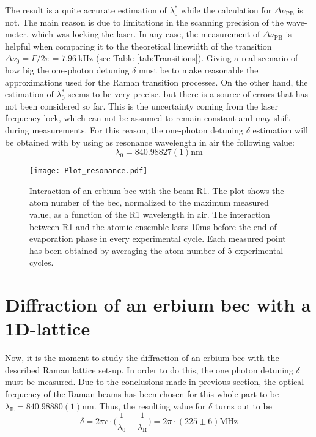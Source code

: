 The result is a quite accurate estimation of $\lambda_0^*$ while the calculation for $\Delta\nu_{\text{PB}}$ is not. The main reason is due to limitations in the scanning precision of the wave-meter, which was locking the laser. In any case, the measurement of $\Delta\nu_{\text{PB}}$ is helpful when comparing it to the theoretical linewidth of the transition $\Delta\nu_0 = \Gamma/2\pi = \SI{7.96}{\kilo\hertz}$ (see Table \ref{tab:Transitions}). Giving a real scenario of how big the one-photon detuning $\delta$ must be to make reasonable the approximations used for the Raman transition processes. On the other hand, the estimation of $\lambda_0^*$ seems to be very precise, but there is a source of errors that has not been considered so far. This is the uncertainty coming from the laser frequency lock, which can not be assumed to remain constant and may shift during measurements. For this reason, the one-photon detuning $\delta$ estimation will be obtained with by using as resonance wavelength in air the following value:
\begin{equation*}
	\lambda_{0} = 840.98827(1)\si{\nano\meter}
\end{equation*}

\begin{figure}\centering
	\texttt{[image: Plot\_resonance.pdf]}
	\caption[Interaction of an erbium \ac{bec} with the beam R1]{Interaction of an erbium \ac{bec} with the beam R1. The plot shows the atom number of the \ac{bec}, normalized to the maximum measured value, as a function of the R1 wavelength in air. The interaction between R1 and the atomic ensemble lasts 10\si{\milli\second} before the end of evaporation phase in every experimental cycle. Each measured point has been obtained by averaging the atom number of 5 experimental cycles. }\label{fig:resonance_841_transition}
\end{figure}

\section{Diffraction of an erbium \ac{bec} with a 1D-lattice}

Now, it is the moment to study the diffraction of an erbium \ac{bec} with the described Raman lattice set-up. In order to do this, the one photon detuning $\delta$ must be measured. Due to the conclusions made in previous section, the optical frequency of the Raman beams has been chosen for this whole part to be $\lambda_\text{R} = 840.98880(1) \si{\nano\meter}$. Thus, the resulting value for $\delta$ turns out to be
\begin{equation*}
	\delta = 2\pi c\cdot\bigg(\frac{1}{\lambda_{0}} - \frac{1}{\lambda_\text{R}} \bigg) = 2\pi \cdot(225 \pm 6) \si{\mega\hertz}
\end{equation*}

